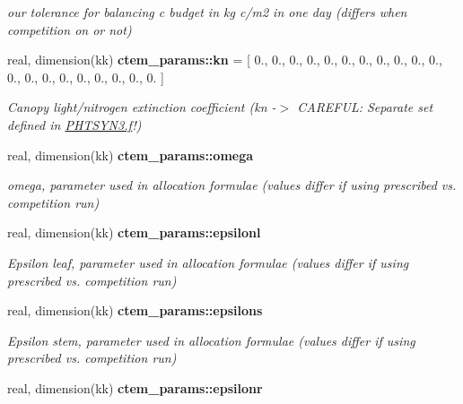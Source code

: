 \begin{DoxyCompactItemize}
\begin{DoxyCompactList}\small\item\em our tolerance for balancing c budget in kg c/m2 in one day (differs when competition on or not) \end{DoxyCompactList}\item 
\hypertarget{namespacectem__params_a3a1fb11af516cf3daa780402bdbde953}{}real, dimension(kk) {\bfseries ctem\+\_\+params\+::kn} = \mbox{[} 0., 0., 0., 0., 0., 0., 0., 0., 0., 0., 0., 0., 0., 0., 0., 0., 0., 0., 0., 0. \mbox{]}\label{namespacectem__params_a3a1fb11af516cf3daa780402bdbde953}

\begin{DoxyCompactList}\small\item\em Canopy light/nitrogen extinction coefficient (kn -\/$>$ C\+A\+R\+E\+F\+U\+L\+: Separate set defined in \hyperlink{PHTSYN3_8f}{P\+H\+T\+S\+Y\+N3.\+f}!) \end{DoxyCompactList}\item 
\hypertarget{namespacectem__params_a632738827e870757c4538eb8abd3ba18}{}real, dimension(kk) {\bfseries ctem\+\_\+params\+::omega}\label{namespacectem__params_a632738827e870757c4538eb8abd3ba18}

\begin{DoxyCompactList}\small\item\em omega, parameter used in allocation formulae (values differ if using prescribed vs. competition run) \end{DoxyCompactList}\item 
\hypertarget{namespacectem__params_a555429920f02dff7239a96256af1a0eb}{}real, dimension(kk) {\bfseries ctem\+\_\+params\+::epsilonl}\label{namespacectem__params_a555429920f02dff7239a96256af1a0eb}

\begin{DoxyCompactList}\small\item\em Epsilon leaf, parameter used in allocation formulae (values differ if using prescribed vs. competition run) \end{DoxyCompactList}\item 
\hypertarget{namespacectem__params_ae5c289e0db08b110ab093ab912b1955b}{}real, dimension(kk) {\bfseries ctem\+\_\+params\+::epsilons}\label{namespacectem__params_ae5c289e0db08b110ab093ab912b1955b}

\begin{DoxyCompactList}\small\item\em Epsilon stem, parameter used in allocation formulae (values differ if using prescribed vs. competition run) \end{DoxyCompactList}\item 
\hypertarget{namespacectem__params_aa0fc6a57a8dd09d0a6d57ccf9c2fdf5b}{}real, dimension(kk) {\bfseries ctem\+\_\+params\+::epsilonr}\label{namespacectem__params_aa0fc6a57a8dd09d0a6d57ccf9c2fdf5b}


\end{DoxyCompactItemize}
